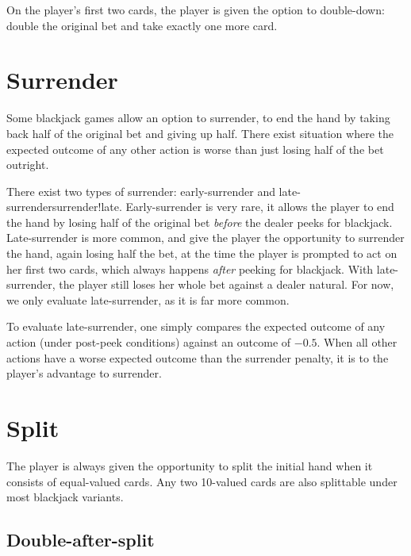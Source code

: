 On the player's first two cards, the player is given the option to
double-down: double the original bet and take exactly one more card.

\section{Surrender}
\label{sec:basic:surrender}

Some blackjack games allow an option to surrender, 
to end the hand by taking back half of the original
bet and giving up half.
There exist situation where the expected outcome of any other action 
is worse than just losing half of the bet outright.  

There exist two types of surrender:
early-surrender and late-surrender{surrender!late}.
Early-surrender is very rare, it allows the player to 
end the hand by losing half of the original bet \emph{before}
the dealer peeks for blackjack.
Late-surrender is more common, and give the player the opportunity to
surrender the hand, again losing half the bet, 
at the time the player is prompted to act on her first two cards, 
which always happens \emph{after} peeking for blackjack.  
With late-surrender, the player still loses her whole bet against 
a dealer natural.
For now, we only evaluate late-surrender, as it is far more common.

To evaluate late-surrender, one simply compares the expected outcome
of any action (under post-peek conditions) against an outcome of $-0.5$.
When all other actions have a worse expected outcome than the surrender
penalty, it is to the player's advantage to surrender.

\section{Split}
\label{sec:basic:split}

The player is always given the opportunity to split
the initial hand when it consists of equal-valued cards.
Any two 10-valued cards are also splittable under most blackjack variants.

\subsection{Double-after-split}
\label{sec:basic:DAS}

